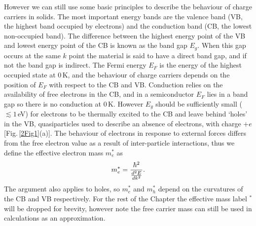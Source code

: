 However we can still use some basic principles to describe the behaviour of charge carriers in solids. The most important energy bands are the valence band (VB, the highest band occupied by electrons) and the conduction band (CB, the lowest non-occupied band). The difference between the highest energy point of the VB and lowest energy point of the CB is known as the band gap $E_g$. When this gap occurs at the same $k$ point the material is said to have a direct band gap, and if not the band gap is indirect. The Fermi energy $E_F$ is the energy of the highest occupied state at 0\,K, and the behaviour of charge carriers depends on the position of $E_F$ with respect to the CB and VB. Conduction relies on the availability of free electrons in the CB, and in a semiconductor $E_F$ lies in a band gap so there is no conduction at 0\,K. However $E_g$ should be sufficiently small ($\lesssim1$\,eV) for electrons to be thermally excited to the CB and leave behind `holes' in the VB, quasiparticles used to describe an absence of electrons, with charge $+e$ [Fig.\,\ref{2Fig1}(a)]. The behaviour of electrons in response to external forces differs from the free electron value as a result of inter-particle interactions, thus we define the effective electron mass $m_e^*$ as
\begin{equation}
\centering
m_e^{*} = \frac{\hbar^2}{\frac{d^2E}{dk^2}} .
\label{effectivemass}
\end{equation}
The argument also applies to holes, so $m_e^*$ and $m_h^*$ depend on the curvatures of the CB and VB respectively. For the rest of the Chapter the effective mass label $^*$ will be dropped for brevity, however note the free carrier mass can still be used in calculations as an approximation.

